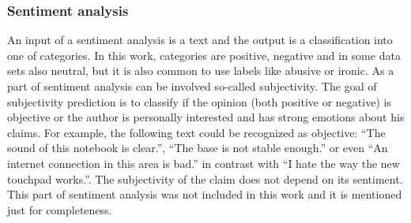 \subsubsection{Sentiment analysis}
An input of a sentiment analysis is a text and the output is a classification into one of categories. In this work, categories are positive, negative and in some data sets also neutral, but it is also common to use labels like abusive or ironic.
As a part of sentiment analysis can be involved so-called subjectivity\citep{Montoyo2012}. The goal of subjectivity prediction is to classify if the
opinion (both positive or negative) is objective or the author is personally interested and has strong emotions about his claims. For example, the following text could be recognized as objective: “The sound of this notebook is clear.”, “The base is not stable enough.” or even “An internet connection in this area is bad.” in contrast with “I hate the way the new touchpad works.”. The subjectivity of the claim does not depend on its sentiment. This part of sentiment analysis was not included in this work and it is mentioned just for completeness. %

